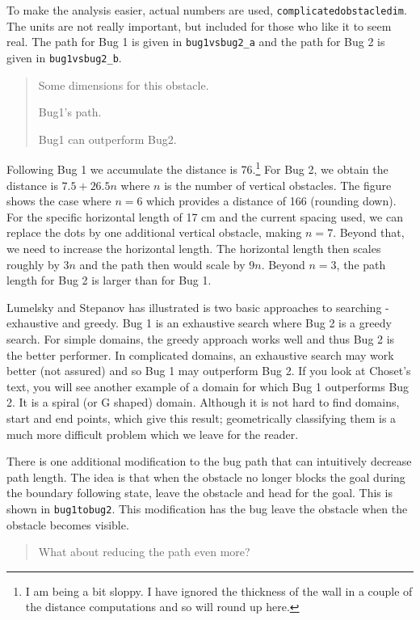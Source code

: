 To make the analysis easier, actual numbers are used,
\texttt{complicatedobstacledim}. The units are not really important, but
included for those who like it to seem real. The path for Bug 1 is given
in \texttt{bug1vsbug2\_a} and the path for Bug 2 is given in
\texttt{bug1vsbug2\_b}.

\begin{quote}
Some dimensions for this obstacle.

Bug1's path.

Bug1 can outperform Bug2.
\end{quote}

Following Bug 1 we accumulate the distance is 76.\footnote{I am being a
  bit sloppy. I have ignored the thickness of the wall in a couple of
  the distance computations and so will round up here.} For Bug 2, we
obtain the distance is \(7.5+26.5n\) where \(n\) is the number of
vertical obstacles. The figure shows the case where \(n=6\) which
provides a distance of 166 (rounding down). For the specific horizontal
length of 17 cm and the current spacing used, we can replace the dots by
one additional vertical obstacle, making \(n=7\). Beyond that, we need
to increase the horizontal length. The horizontal length then scales
roughly by \(3n\) and the path then would scale by \(9n\). Beyond
\(n=3\), the path length for Bug 2 is larger than for Bug 1.

Lumelsky and Stepanov has illustrated is two basic approaches to
searching - exhaustive and greedy. Bug 1 is an exhaustive search where
Bug 2 is a greedy search. For simple domains, the greedy approach works
well and thus Bug 2 is the better performer. In complicated domains, an
exhaustive search may work better (not assured) and so Bug 1 may
outperform Bug 2. If you look at Choset's text, you will see another
example of a domain for which Bug 1 outperforms Bug 2. It is a spiral
(or G shaped) domain. Although it is not hard to find domains, start and
end points, which give this result; geometrically classifying them is a
much more difficult problem which we leave for the reader.

There is one additional modification to the bug path that can
intuitively decrease path length. The idea is that when the obstacle no
longer blocks the goal during the boundary following state, leave the
obstacle and head for the goal. This is shown in \texttt{bug1tobug2}.
This modification has the bug leave the obstacle when the obstacle
becomes visible.

\begin{quote}
What about reducing the path even more?
\end{quote}

